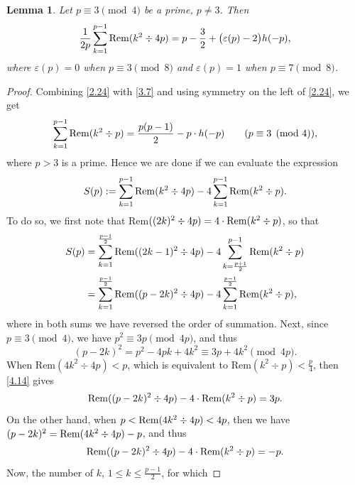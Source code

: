 \documentclass{amsart}
\theoremstyle{plain}
\newtheorem{lemma}[theorem]{Lemma}
\numberwithin{equation}{section}
\begin{document}
\begin{lemma}\label{lem:4.7}
Let $p\equiv 3\pmod{4}$ be a prime, $p\neq 3$. Then
\begin{equation}\label{4.10}
\frac{1}{2p}\sum_{k=1}^{p-1}{\rm Rem}(k^2\div 4p)
= p-\frac{3}{2}+\big(\varepsilon(p)-2\big)h(-p),
\end{equation}
where $\varepsilon(p)=0$ when $p\equiv 3\pmod{8}$ and $\varepsilon(p)=1$ 
when $p\equiv 7\pmod{8}$.
\end{lemma}

\begin{proof}
Combining \eqref{2.24} with \eqref{3.7} and using symmetry on the left of 
\eqref{2.24}, we get
\begin{equation}\label{4.11}
\sum_{k=1}^{p-1}{\rm Rem}(k^2\div p) = \frac{p(p-1)}{2}
-p\cdot h(-p)\qquad (p\equiv 3\pmod{4}),
\end{equation}
where $p>3$ is a prime. Hence we are done if we can evaluate the expression 
\begin{equation}\label{4.12}
S(p):=\sum_{k=1}^{p-1}{\rm Rem}(k^2\div 4p)
-4\sum_{k=1}^{p-1}{\rm Rem}(k^2\div p).
\end{equation}
To do so, we first note that Rem$((2k)^2\div 4p)=4\cdot{\rm Rem}(k^2\div p)$, 
so that
\begin{align}
S(p)&=\sum_{k=1}^{\frac{p-1}{2}}{\rm Rem}((2k-1)^2\div 4p)
-4\sum_{k=\frac{p+1}{2}}^{p-1}{\rm Rem}(k^2\div p)\label{4.13}\\
&=\sum_{k=1}^{\frac{p-1}{2}}{\rm Rem}((p-2k)^2\div 4p)
-4\sum_{k=1}^{\frac{p-1}{2}}{\rm Rem}(k^2\div p),\nonumber
\end{align}
where in both sums we have reversed the order of summation.
Next, since $p\equiv 3\pmod{4}$, we have $p^2\equiv 3p\pmod{4p}$, and thus
\begin{equation}\label{4.14}
(p-2k)^2 = p^2-4pk+4k^2 \equiv 3p+4k^2\pmod{4p}.
\end{equation}
When Rem$(4k^2\div 4p)<p$, which is equivalent to Rem$(k^2\div p)<\frac{p}{4}$,
then \eqref{4.14} gives
\begin{equation}\label{4.15}
{\rm Rem}((p-2k)^2\div 4p) - 4\cdot {\rm Rem}(k^2\div p) = 3p.
\end{equation}
On the other hand, when $p<{\rm Rem}(4k^2\div 4p)<4p$, then we have
$(p-2k)^2 = {\rm Rem}(4k^2\div 4p)-p$, and thus
\begin{equation}\label{4.16}
{\rm Rem}((p-2k)^2\div 4p) - 4\cdot {\rm Rem}(k^2\div p) = -p.
\end{equation} 
Now, the number of $k$, $1\leq k\leq\frac{p-1}{2}$, for which

\end{proof}
\end{document}
